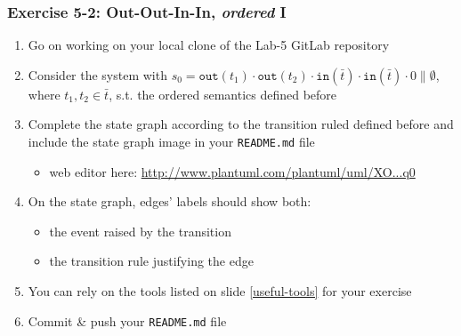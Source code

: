 \documentclass[presentation]{beamer}\mode<presentation>{\usetheme{AMSCesenaPurpleAndGold}}
\begin{document}
\begin{frame}
\frametitle{Exercise 5-2: Out-Out-In-In, \emph{ordered} I}
    \begin{enumerate}
        \item Go on working on your local clone of the Lab-5 GitLab repository
        
        \vfill
        
        \item Consider the system with \alert{$s_0 = \mathtt{out}(t_1) \cdot \mathtt{out}(t_2) \cdot \mathtt{in}(\bar t) \cdot \mathtt{in}(\bar t) \cdot 0  \parallel \emptyset$}, where $t_1, t_2 \in \bar{t}$, s.t. the \alert{ordered} \linda{} semantics defined before
        
        \vfill
    
        \item Complete the state graph according to the transition ruled defined before and include the state graph image in your \alert{\texttt{README.md}} file
        \begin{itemize}
            \item web editor here: \href{
                http://www.plantuml.com/plantuml/uml/XO_1IiD048RlynHpR8MMjCTIacBLenvgJxM79JlMePlTi3khHl5WKV15V1kVeazYQeH627XOzeV__pwOMH3b9HO6mfPjgRmgy8nkLJHouQmi-8bmdBJAXIYXdqegGyYY3EUXcxvK1U7SHS_auOur8HMbLAWfv9vBOMUXHOQ36fy1yLJbsurtqUgvCyvFf-TMizsaAJh3zzIrM5fwBEj4kbvLP8nxW1U0rSaQ1uCKGmADFYGJT55wij-zzeU_QTSVikt9rzlnJt3_yLc_TmX9OnYrm1kxkbfUrsaDZRUf_x4TK0YZHZS-xhjqO_nxqmIpB8CPMHqBymq0
            }{http://www.plantuml.com/plantuml/uml/XO...q0}
        \end{itemize}
        
        \vfill
        
        \item On the state graph, edges' labels should show both:
        \begin{itemize}
            \item the event raised by the transition
            \item the transition rule justifying the edge
        \end{itemize}
        
        \vfill
        
        \item You can rely on the tools listed on slide \ref{useful-tools} for your exercise
        
        \vfill
        
        \item Commit \& push your \texttt{README.md} file
        
    \end{enumerate}
    
\end{frame}
\end{document}
